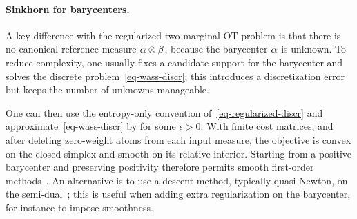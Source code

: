 \paragraph{Sinkhorn for barycenters.}

A key difference with the regularized two-marginal OT problem is that there is no canonical reference measure $\alpha\otimes\beta$, because the barycenter $\alpha$ is unknown. To reduce complexity, one usually fixes a candidate support for the barycenter and solves the discrete problem~\eqref{eq-wass-discr}; this introduces a discretization error but keeps the number of unknowns manageable.

One can then use the entropy-only convention of~\eqref{eq-regularized-discr} and approximate~\eqref{eq-wass-discr} by
for some $\epsilon>0$. With finite cost matrices, and after deleting zero-weight atoms from each input measure, the objective is convex on the closed simplex and smooth on its relative interior. Starting from a positive barycenter and preserving positivity therefore permits smooth first-order methods~\cite{CuturiBarycenter}. An alternative is to use a descent method, typically quasi-Newton, on the semi-dual~\cite{2016-Cuturi-siims}; this is useful when adding extra regularization on the barycenter, for instance to impose smoothness.

